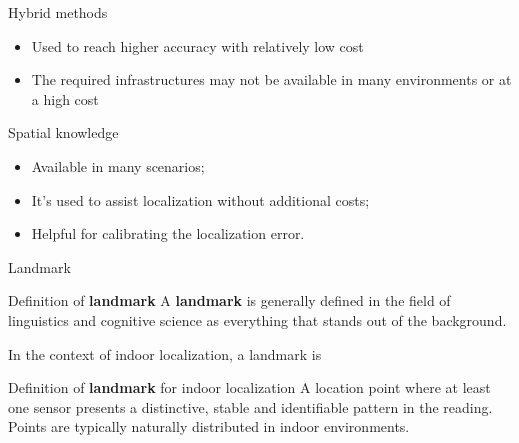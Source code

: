 \begin{frame}{Hybrid methods}
    \pause
    \begin{itemize}
        \item Used to reach higher accuracy with relatively low cost
    \end{itemize}
    \pause
    \vspace{10pt}
    \pause
    \begin{itemize}
        \item The required infrastructures may not be available in many environments or at a high cost
    \end{itemize}
\end{frame}

\begin{frame}{Spatial knowledge}
    \begin{itemize}[<+-| @alert +>]
        \item Available in many scenarios;
        \item It's used to assist localization without additional costs;
        \item Helpful for calibrating the localization error.
    \end{itemize}
\end{frame}

\begin{frame}{Landmark}
    \begin{block}{Definition of \textbf{landmark}}
        A \textbf{landmark} is generally defined in the field of linguistics and cognitive science as everything that stands out of the background.
    \end{block}
    \pause
    In the context of indoor localization, a landmark is 
    \begin{block}{Definition of \textbf{landmark} for indoor localization}
        A location point where at least one sensor presents a distinctive, stable  and identifiable pattern in the reading. Points are typically naturally distributed in indoor environments.
    \end{block}
\end{frame}


